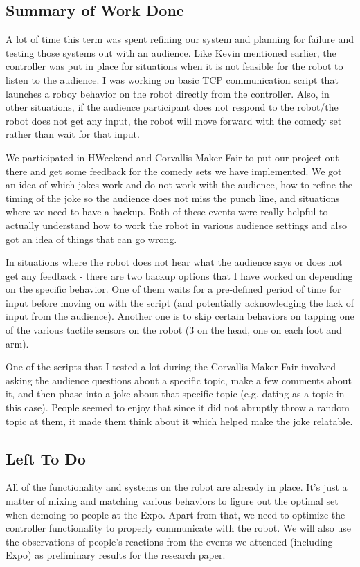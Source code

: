 \documentclass[onecolumn, draftclsnofoot,10pt, compsoc]{IEEEtran}
\begin{document}
\subsection{Summary of Work Done}
A lot of time this term was spent refining our system and planning for failure and testing those systems out with an audience. Like Kevin mentioned earlier, the controller was put in place for situations when it is not feasible for the robot to listen to the audience. I was working on basic TCP communication script that launches a roboy behavior on the robot directly from the controller.  Also, in other situations, if the audience participant does not respond to the robot/the robot does not get any input, the robot will move forward with the comedy set rather than wait for that input.

We participated in HWeekend and Corvallis Maker Fair to put our project out there and get some feedback for the comedy sets we have implemented. We got an idea of which jokes work and do not work with the audience, how to refine the timing of the joke so the audience does not miss the punch line, and situations where we need to have a backup. Both of these events were really helpful to actually understand how to work the robot in various audience settings and also got an idea of things that can go wrong.

In situations where the robot does not hear what the audience says or does not get any feedback - there are two backup options that I have worked on depending on the specific behavior. One of them waits for a pre-defined period of time for input before moving on with the script (and potentially acknowledging the lack of input from the audience). Another one is to skip certain behaviors on tapping one of the various tactile sensors on the robot (3 on the head, one on each foot and arm).

One of the scripts that I tested a lot during the Corvallis Maker Fair involved asking the audience questions about a specific topic, make a few comments about it, and then phase into a joke about that specific topic (e.g. dating as a topic in this case). People seemed to enjoy that since it did not abruptly throw a random topic at them, it made them think about it which helped make the joke relatable.

\subsection{Left To Do}
All of the functionality and systems on the robot are already in place. It's just a matter of mixing and matching various behaviors to figure out the optimal set when demoing to people at the Expo. Apart from that, we need to optimize the controller functionality to properly communicate with the robot. We will also use the observations of people's reactions from the events we attended (including Expo) as preliminary results for the research paper.
\end{document}
